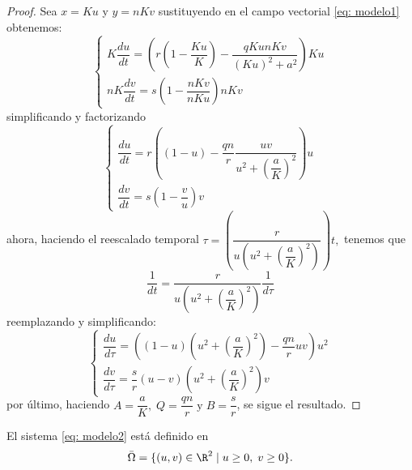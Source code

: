 {    \begin{proof}
    	Sea $x = Ku$ y $y = nKv$ sustituyendo en el campo vectorial \eqref{eq: modelo1} obtenemos:
    	\begin{equation*}
    		\begin{cases}
    			K\dfrac{du}{dt} = (r \left(1-\dfrac{Ku}{K}\right) - \dfrac{qKunKv}{(Ku)^{2}+a^{2}}) Ku \\
    			nK\dfrac{dv}{dt} = s \left(1-\dfrac{nKv}{nKu}\right)nKv
    		\end{cases}
    	\end{equation*}
    	simplificando y factorizando
    	\begin{equation*}
    		\begin{cases}
    			\dfrac{du}{dt} = r\left((1-u) - \dfrac{qn}{r} \dfrac{uv}{u^{2}+\left(\dfrac{a}{K}\right)^{2}}\right)u \\
    			\dfrac{dv}{dt} = s \left(1-\dfrac{v}{u}\right)v
    		\end{cases}
    	\end{equation*}
    	ahora, haciendo el reescalado temporal $\tau = \left(\dfrac{r}{u\left(u^{2}+\left(\dfrac{a}{K}\right)^{2}\right)}\right)t,$ tenemos que $$\dfrac{1}{dt} = \dfrac{r}{u\left(u^{2}+\left(\dfrac{a}{K}\right)^{2}\right)} \dfrac{1}{d\tau}$$ reemplazando y simplificando:
    	\begin{equation*}
    		\begin{cases}
    			\dfrac{du}{d\tau} = \left((1-u)\left(u^{2}+\left(\dfrac{a}{K}\right)^{2}\right) - \dfrac{qn}{r} uv\right)u^{2} \\
    			\dfrac{dv}{d\tau} = \dfrac{s}{r} \left(u-v\right)\left(u^{2}+\left(\dfrac{a}{K}\right)^{2}\right)v
    		\end{cases}
    	\end{equation*}
    	por último, haciendo $A = \dfrac{a}{K}, \; Q = \dfrac{qn}{r} \; \text{y} \; B = \dfrac{s}{r}$, se sigue el resultado.
    \end{proof}
    
    El sistema \eqref{eq: modelo2} está definido en $$\bar{\Omega} = \{ (u, v) \in \R^{2} \; | \; u \geq 0, \; v \geq 0 \}.$$
    
}
